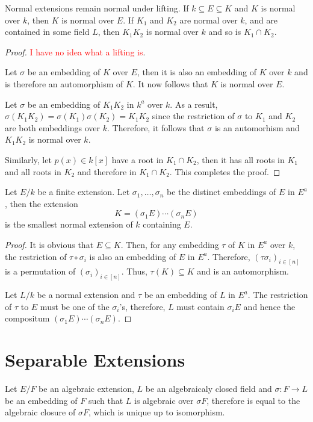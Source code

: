 \begin{theorem}
    Normal extensions remain normal under lifting. If $k\subseteq E\subseteq K$ and $K$ is normal over $k$, then $K$ is normal over $E$. If $K_1$ and $K_2$ are normal over $k$, and are contained in some field $L$, then $K_1K_2$ is normal over $k$ and so is $K_1\cap K_2$.
\end{theorem}
\begin{proof}
    \textcolor{red}{I have no idea what a lifting is}. 

    Let $\sigma$ be an embedding of $K$ over $E$, then it is also an embedding of $K$ over $k$ and is therefore an automorphism of $K$. It now follows that $K$ is normal over $E$.
    
    Let $\sigma$ be an embedding of $K_1K_2$ in $k^a$ over $k$. As a result, $\sigma(K_1K_2) = \sigma(K_1)\sigma(K_2) = K_1K_2$ since the restriction of $\sigma$ to $K_1$ and $K_2$ are both embeddings over $k$. Therefore, it follows that $\sigma$ is an automorhism and $K_1K_2$ is normal over $k$.

    Similarly, let $p(x)\in k[x]$ have a root in $K_1\cap K_2$, then it has all roots in $K_1$ and all roots in $K_2$ and therefore in $K_1\cap K_2$. This completes the proof.
\end{proof}

\begin{theorem}
    Let $E/k$ be a finite extension. Let $\sigma_1,\ldots,\sigma_n$ be the distinct embeddings of $E$ in $E^a$, then the extension 
    \begin{equation*}
        K = (\sigma_1E)\cdots(\sigma_nE)
    \end{equation*}
    is the smallest normal extension of $k$ containing $E$.
\end{theorem}
\begin{proof}
    It is obvious that $E\subseteq K$. Then, for any embedding $\tau$ of $K$ in $E^a$ over $k$, the restriction of $\tau\circ\sigma_i$ is also an embedding of $E$ in $E^a$. Therefore, $(\tau\sigma_i)_{i\in [n]}$ is a permutation of $(\sigma_i)_{i\in[n]}$. Thus, $\tau(K)\subseteq K$ and is an automorphism.

    Let $L/k$ be a normal extension and $\tau$ be an embedding of $L$ in $E^a$. The restriction of $\tau$ to $E$ must be one of the $\sigma_i$'s, therefore, $L$ must contain $\sigma_iE$ and hence the compositum $(\sigma_1E)\cdots(\sigma_nE)$.
\end{proof}

\section{Separable Extensions}
Let $E/F$ be an algebraic extension, $L$ be an algebraicaly closed field and $\sigma: F\to L$ be an embedding of $F$ such that $L$ is algebraic over $\sigma F$, therefore is equal to the algebraic closure of $\sigma F$, which is unique up to isomorphism. 

